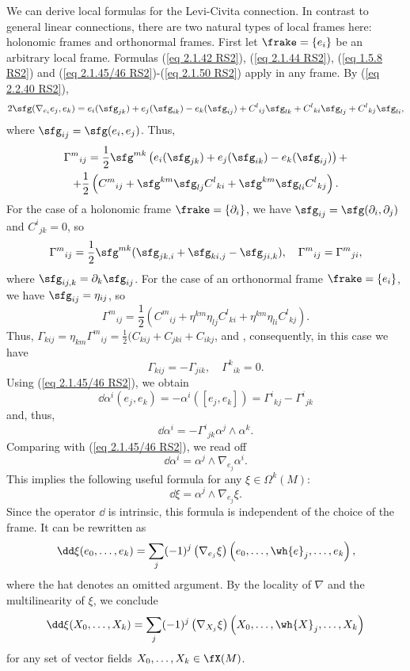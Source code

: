 \begin{rem}
    We can derive local formulas for the Levi-Civita connection. In contrast to general linear connections, there are two natural types of local frames here: holonomic frames and orthonormal frames. First let $\frake=\{e_i\}$ be an arbitrary local frame. Formulas (\ref{eq 2.1.42 RS2}), (\ref{eq 2.1.44 RS2}), (\ref{eq 1.5.8 RS2}) and (\ref{eq 2.1.45/46 RS2})-(\ref{eq 2.1.50 RS2}) apply in any frame. By (\ref{eq 2.2.40 RS2}),
    \[2\sfg(\nabla_{e_i}e_j,e_k)=e_i(\sfg_{jk})+e_j(\sfg_{ik})-e_k(\sfg_{ij})+C^l{}_{ij}\sfg_{lk}+C^l{}_{ki}\sfg_{lj}+C^l{}_{kj}\sfg_{li},\]
    where $\sfg_{ij}=\sfg(e_i,e_j)$. Thus, 
    \begin{multline}
        \Gamma^m{}_{ij}=\frac12\sfg^{mk}\left(e_i(\sfg_{jk})+e_j(\sfg_{ik})-e_k(\sfg_{ij})\right)+\\
        +\frac12\left(C^m{}_{ij}+\sfg^{km}\sfg_{lj}C^l{}_{ki}+\sfg^{km}\sfg_{li}C^l{}_{kj}\right).\label{eq 2.2.41 RS2}
    \end{multline}
    For the case of a holonomic frame $\frake=\{\partial_i\}$, we have $\sfg_{ij}=\sfg(\partial_i,\partial_j)$ and $C^i{}_{jk}=0$, so 
    \[\Gamma^m{}_{ij}=\frac12\sfg^{mk}(\sfg_{jk,i}+\sfg_{ki,j}-\sfg_{ji,k}),\quad \Gamma^m{}_{ij}=\Gamma^m{}_{ji},\]
    where $\sfg_{ij,k}=\partial_k\sfg_{ij}$. For the case of an orthonormal frame $\frake=\{e_i\}$, we have $\sfg_{ij}=\eta_{ij}$, so 
    \[\Gamma^m{}_{ij}=\frac12\left(C^m{}_{ij}+\eta^{km}\eta_{lj}C^l{}_{ki}+\eta^{km}\eta_{li}C^l{}_{kj}\right).\]
    Thus, $\Gamma_{kij}=\eta_{km}\Gamma^m{}_{ij}=\frac12(C_{kij}+C_{jki}+C_{ikj}$, and , consequently, in this case we have 
    \[\Gamma_{kij}=-\Gamma_{jik},\quad \Gamma^k{}_{ik}=0.\]
    Using (\ref{eq 2.1.45/46 RS2}), we obtain 
    \[\dd\alpha^i(e_j,e_k)=-\alpha^i([e_j,e_k])=\Gamma^i{}_{kj}-\Gamma^i{}_{jk}\]
    and, thus,
    \[\dd\alpha^i=-\Gamma^i{}_{jk}\alpha^j\wedge\alpha^k.\]
    Comparing with (\ref{eq 2.1.45/46 RS2}), we read off 
    \[\dd\alpha^i=\alpha^j\wedge \nabla_{e_j}\alpha^i.\]
    This implies the following useful formula for any $\xi\in\Omega^k(M)$:
    \[\dd\xi=\alpha^j\wedge\nabla_{e_j}\xi.\label{eq 2.2.47 RS2}\]
    Since the operator $\dd$ is intrinsic, this formula is independent of the choice of the frame. It can be rewritten as 
    \[\dd\xi(e_0,\ldots,e_k)=\sum_j (-1)^j\left(\nabla_{e_j}\xi\right)\left(e_0,\ldots,\wh{e}_j,\ldots,e_k\right),\]
    where the hat denotes an omitted argument. By the locality of $\nabla$ and the multilinearity of $\xi$, we conclude 
    \[\dd\xi(X_0,\ldots,X_k)=\sum_j (-1)^j\left(\nabla_{X_j}\xi\right)\left(X_0,\ldots,\wh{X}_j,\ldots,X_k\right)\label{eq 2.2.49 RS2}\]
    for any set of vector fields $X_0,\ldots,X_k\in\fX(M)$.
\end{rem}


